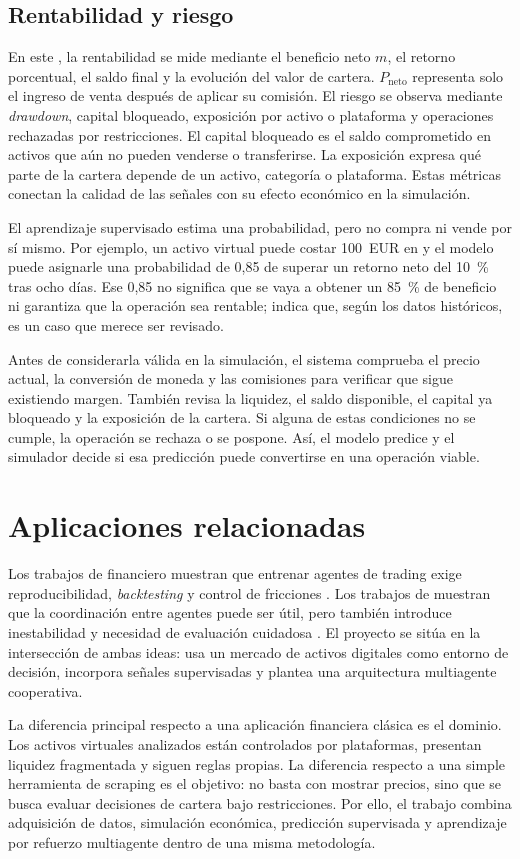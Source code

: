 \subsection{Rentabilidad y riesgo}

En este , la rentabilidad se mide mediante el beneficio neto $m$, el retorno porcentual, el saldo final y la evolución del valor de cartera. $P_{\mathrm{neto}}$ representa solo el ingreso de venta después de aplicar su comisión. El riesgo se observa mediante \textit{drawdown}, capital bloqueado, exposición por activo o plataforma y operaciones rechazadas por restricciones. El capital bloqueado es el saldo comprometido en activos que aún no pueden venderse o transferirse. La exposición expresa qué parte de la cartera depende de un activo, categoría o plataforma. Estas métricas conectan la calidad de las señales con su efecto económico en la simulación.

El aprendizaje supervisado estima una probabilidad, pero no compra ni vende por sí mismo. Por ejemplo, un activo virtual puede costar 100~EUR en  y el modelo puede asignarle una probabilidad de 0,85 de superar un retorno neto del 10~\% tras ocho días. Ese 0,85 no significa que se vaya a obtener un 85~\% de beneficio ni garantiza que la operación sea rentable; indica que, según los datos históricos, es un caso que merece ser revisado.

Antes de considerarla válida en la simulación, el sistema comprueba el precio actual, la conversión de moneda y las comisiones para verificar que sigue existiendo margen. También revisa la liquidez, el saldo disponible, el capital ya bloqueado y la exposición de la cartera. Si alguna de estas condiciones no se cumple, la operación se rechaza o se pospone. Así, el modelo predice y el simulador decide si esa predicción puede convertirse en una operación viable.

\section{Aplicaciones relacionadas}

Los trabajos de  financiero muestran que entrenar agentes de trading exige reproducibilidad, \textit{backtesting} y control de fricciones \cite{liu2021finrl}. Los trabajos de  muestran que la coordinación entre agentes puede ser útil, pero también introduce inestabilidad y necesidad de evaluación cuidadosa \cite{lowe2017maddpg,yu2022mappo}. El proyecto se sitúa en la intersección de ambas ideas: usa un mercado de activos digitales como entorno de decisión, incorpora señales supervisadas y plantea una arquitectura multiagente cooperativa.

La diferencia principal respecto a una aplicación financiera clásica es el dominio. Los activos virtuales analizados están controlados por plataformas, presentan liquidez fragmentada y siguen reglas propias. La diferencia respecto a una simple herramienta de scraping es el objetivo: no basta con mostrar precios, sino que se busca evaluar decisiones de cartera bajo restricciones. Por ello, el trabajo combina adquisición de datos, simulación económica, predicción supervisada y aprendizaje por refuerzo multiagente dentro de una misma metodología.
